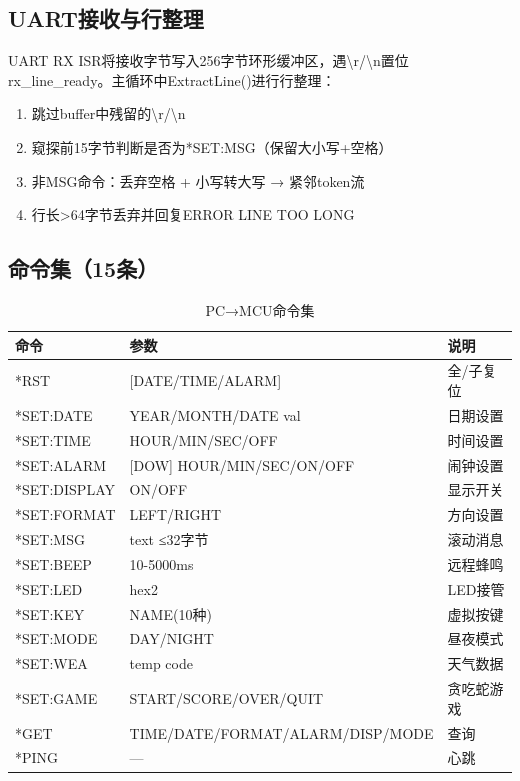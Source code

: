 \documentclass[12pt,hyperref,a4paper,UTF8]{ctexart}
\begin{document}
\subsection{UART接收与行整理}

UART RX ISR将接收字节写入256字节环形缓冲区，遇\textbackslash r/\textbackslash n置位rx\_line\_ready。主循环中ExtractLine()进行行整理：

\begin{enumerate}
    \item 跳过buffer中残留的\textbackslash r/\textbackslash n
    \item 窥探前15字节判断是否为*SET:MSG（保留大小写+空格）
    \item 非MSG命令：丢弃空格 + 小写转大写 → 紧邻token流
    \item 行长>64字节丢弃并回复ERROR LINE TOO LONG
\end{enumerate}

\subsection{命令集（15条）}

\begin{table}[!htbp]
    \centering
    \begin{tabular}{l|l|l}
    \hline
    \textbf{命令} & \textbf{参数} & \textbf{说明} \\
    \hline
    *RST & [DATE/TIME/ALARM] & 全/子复位 \\
    *SET:DATE & YEAR/MONTH/DATE val & 日期设置 \\
    *SET:TIME & HOUR/MIN/SEC/OFF & 时间设置 \\
    *SET:ALARM & [DOW] HOUR/MIN/SEC/ON/OFF & 闹钟设置 \\
    *SET:DISPLAY & ON/OFF & 显示开关 \\
    *SET:FORMAT & LEFT/RIGHT & 方向设置 \\
    *SET:MSG & text ≤32字节 & 滚动消息 \\
    *SET:BEEP & 10-5000ms & 远程蜂鸣 \\
    *SET:LED & hex2 & LED接管 \\
    *SET:KEY & NAME(10种) & 虚拟按键 \\
    *SET:MODE & DAY/NIGHT & 昼夜模式 \\
    *SET:WEA & temp code & 天气数据 \\
    *SET:GAME & START/SCORE/OVER/QUIT & 贪吃蛇游戏 \\
    *GET & TIME/DATE/FORMAT/ALARM/DISP/MODE & 查询 \\
    *PING & — & 心跳 \\
    \hline
    \end{tabular}
    \caption{PC→MCU命令集}
\end{table}
\end{document}
